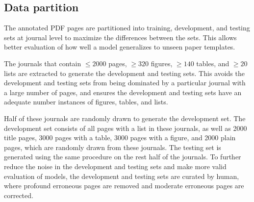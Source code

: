 \documentclass[conference]{IEEEtran}
\begin{document}
\subsection{Data partition}

The annotated PDF pages are partitioned into training, development, and testing sets at journal level to maximize the differences between the sets. This allows better evaluation of how well a model generalizes to unseen paper templates.

The journals that contain $\le 2000$ pages, $\ge 320$ figures, $\ge 140$ tables, and $\ge 20$ lists are extracted to generate the development and testing sets. This avoids the development and testing sets from being dominated by a particular journal with a large number of pages, and ensures the development and testing sets have an adequate number instances of figures, tables, and lists.

Half of these journals are randomly drawn to generate the development set. The development set consists of all pages with a list in these journals, as well as 2000 title pages, 3000 pages with a table, 3000 pages with a figure, and 2000 plain pages, which are randomly drawn from these journals. The testing set is generated using the same procedure on the rest half of the journals. To further reduce the noise in the development and testing sets and make more valid evaluation of models, the development and testing sets are curated by human, where profound erroneous pages are removed and moderate erroneous pages are corrected.
\end{document}
